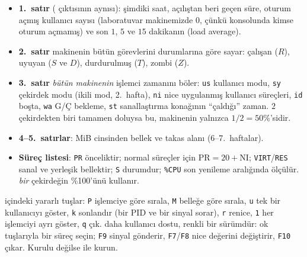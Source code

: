\begin{itemize}
  \item \textbf{1.~satır} ( çıktısının aynısı): şimdiki saat, açılıştan beri geçen süre, oturum açmış kullanıcı sayısı (laboratuvar makinemizde $0$, çünkü konsolunda kimse oturum açmamış) ve son $1$, $5$ ve $15$ dakikanın  (load average).
  \item \textbf{2.~satır} makinenin bütün görevlerini durumlarına göre sayar: çalışan ($R$), uyuyan ($S$ ve $D$), durdurulmuş ($T$), zombi ($Z$).
  \item \textbf{3.~satır} \emph{bütün makinenin} işlemci zamanını böler: \texttt{us} kullanıcı modu, \texttt{sy} çekirdek modu (ikili mod, 2.~hafta), \texttt{ni} nice uygulanmış kullanıcı süreçleri, \texttt{id} boşta, \texttt{wa} G/Ç bekleme, \texttt{st} sanallaştırma konağının ``çaldığı'' zaman. $2$ çekirdekten biri tamamen doluysa bu, makinenin yalnızca $1/2 = 50\%$'sidir.
  \item \textbf{4--5.~satırlar}: MiB cinsinden bellek ve takas alanı (6--7.~haftalar).
  \item \textbf{Süreç listesi}: \texttt{PR} önceliktir; normal süreçler için $\text{PR} = 20 + \text{NI}$; \texttt{VIRT}/\texttt{RES} sanal ve yerleşik bellektir; \texttt{S} durumdur; \texttt{\%CPU} son yenileme aralığında ölçülür.  \emph{bir} çekirdeğin \%100'ünü kullanır.
\end{itemize}

 içindeki yararlı tuşlar: \texttt{P} işlemciye göre sırala, \texttt{M} belleğe göre sırala, \texttt{u} tek bir kullanıcıyı göster, \texttt{k} sonlandır (bir PID ve bir sinyal sorar), \texttt{r} renice, \texttt{1} her işlemciyi ayrı göster, \texttt{q} çık.  daha kullanıcı dostu, renkli bir sürümdür: ok tuşlarıyla bir süreç seçin; \texttt{F9} sinyal gönderir, \texttt{F7}/\texttt{F8} nice değerini değiştirir, \texttt{F10} çıkar. Kurulu değilse  ile kurun.

